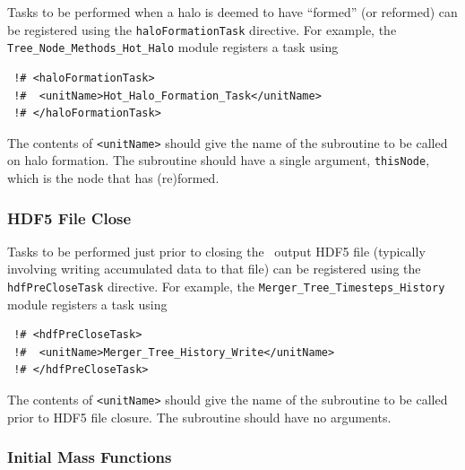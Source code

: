 Tasks to be performed when a halo is deemed to have ``formed'' (or reformed) can be registered using the {\tt haloFormationTask} directive. For example, the {\tt Tree\_Node\_Methods\_Hot\_Halo} module registers a task using
\begin{verbatim}
 !# <haloFormationTask>
 !#  <unitName>Hot_Halo_Formation_Task</unitName>
 !# </haloFormationTask>
\end{verbatim}
The contents of {\tt <unitName>} should give the name of the subroutine to be called on halo formation. The subroutine should have a single argument, {\tt thisNode}, which is the node that has (re)formed.

\subsubsection{HDF5 File Close}

Tasks to be performed just prior to closing the \glc\ output HDF5 file (typically involving writing accumulated data to that file) can be registered using the {\tt hdfPreCloseTask} directive. For example, the {\tt Merger\_Tree\_Timesteps\_History} module registers a task using
\begin{verbatim}
 !# <hdfPreCloseTask>
 !#  <unitName>Merger_Tree_History_Write</unitName>
 !# </hdfPreCloseTask>
\end{verbatim}
The contents of {\tt <unitName>} should give the name of the subroutine to be called prior to HDF5 file closure. The subroutine should have no arguments.

\subsubsection{Initial Mass Functions}\label{sec:imfTasks}

